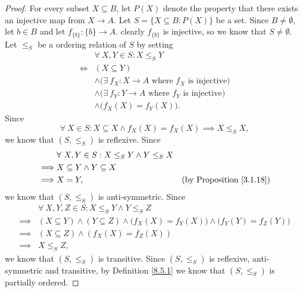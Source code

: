\begin{proof}
    For every subset \(X \subseteq B\), let \(P(X)\) denote the property that there exists an injective map from \(X \to A\).
    Let \(S = \{X \subseteq B : P(X)\}\) be a set.
    Since \(B \neq \emptyset\), let \(b \in B\) and let \(f_{\{b\}} : \{b\} \to A\).
    clearly \(f_{\{b\}}\) is injective, so we know that \(S \neq \emptyset\).
    Let \(\leq_S\) be a ordering relation of \(S\) by setting
    \begin{align*}
             & \forall\ X, Y \in S : X \leq_S Y                                          \\
        \iff & (X \subseteq Y)                                                           \\
             & \land \big(\exists\ f_X : X \to A \text{ where \(f_X\) is injective}\big) \\
             & \land \big(\exists\ f_Y : Y \to A \text{ where \(f_Y\) is injective}\big) \\
             & \land \big(f_X(X) = f_Y(X)\big).
    \end{align*}
    Since
    \[
        \forall\ X \in S : X \subseteq X \land f_X(X) = f_X(X) \implies X \leq_S X,
    \]
    we know that \((S, \leq_S)\) is reflexive.
    Since
    \begin{align*}
                 & \forall\ X, Y \in S : X \leq_S Y \land Y \leq_S X                                        \\
        \implies & X \subseteq Y \land Y \subseteq X                                                        \\
        \implies & X = Y,                                            & \text{(by Proposition \ref{3.1.18})}
    \end{align*}
    we know that \((S, \leq_S)\) is anti-symmetric.
    Since
    \begin{align*}
                 & \forall\ X, Y, Z \in S : X \leq_S Y \land Y \leq_S Z                                                  \\
        \implies & (X \subseteq Y) \land (Y \subseteq Z) \land \big(f_X(X) = f_Y(X)\big) \land \big(f_Y(Y) = f_Z(Y)\big) \\
        \implies & (X \subseteq Z) \land (f_X(X) = f_Z(X))                                                               \\
        \implies & X \leq_S Z,
    \end{align*}
    we know that \((S, \leq_S)\) is transitive.
    Since \((S, \leq_S)\) is reflexive, anti-symmetric and transitive, by Definition \ref{8.5.1} we know that \((S, \leq_S)\) is partially ordered.


\end{proof}
